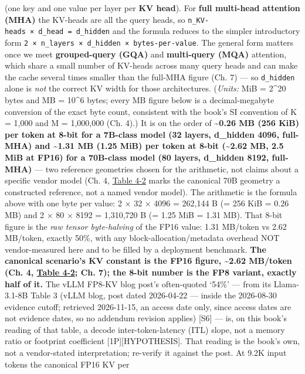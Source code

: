 (one key and one value per layer per \textbf{KV head}). For \textbf{full
multi-head attention (MHA)} the KV-heads are all the query heads, so
\texttt{n\_KV-heads\ ×\ d\_head\ =\ d\_hidden} and the formula reduces
to the simpler introductory form
\texttt{2\ ×\ n\_layers\ ×\ d\_hidden\ ×\ bytes-per-value}. The general
form matters once we meet \textbf{grouped-query (GQA)} and
\textbf{multi-query (MQA)} attention, which share a small number of
KV-heads across many query heads and can make the cache several times
smaller than the full-MHA figure (Ch. 7) --- so \texttt{d\_hidden} alone
is \emph{not} the correct KV width for those architectures.
(\emph{Units:} MiB = 2\^{}20 bytes and MB = 10\^{}6 bytes; every MB
figure below is a decimal-megabyte conversion of the exact byte count,
consistent with the book's SI convention of K = 1,000 and M = 1,000,000
(Ch. 4).) It is on the order of \textbf{\textasciitilde0.26 MB (256 KiB)
per token at 8-bit for a 7B-class model (32 layers, d\_hidden 4096,
full-MHA) and \textasciitilde1.31 MB (1.25 MiB) per token at 8-bit
(\textasciitilde2.62 MB, 2.5 MiB at FP16) for a 70B-class model (80
layers, d\_hidden 8192, full-MHA)} --- two reference geometries chosen
for the arithmetic, not claims about a specific vendor model (Ch. 4,
\hyperref[tab:4.2]{Table 4-2} marks the canonical 70B geometry a constructed reference, not
a named vendor model). The arithmetic is the formula above with one byte
per value: 2 × 32 × 4096 = 262,144 B (= 256 KiB = 0.26 MB) and 2 × 80 ×
8192 = 1,310,720 B (= 1.25 MiB = 1.31 MB). That 8-bit figure is the
\emph{raw tensor byte-halving} of the FP16 value: 1.31 MB/token vs 2.62
MB/token, exactly 50\%, with any block-allocation/metadata overhead NOT
vendor-measured here and to be filled by a deployment benchmark.
\textbf{The canonical scenario's KV constant is the FP16 figure,
\textasciitilde2.62 MB/token (Ch. 4, \hyperref[tab:4.2]{Table 4-2}; Ch. 7); the 8-bit number
is the FP8 variant, exactly half of it.} The vLLM FP8-KV blog post's
often-quoted `54\%' --- from its Llama-3.1-8B Table 3 (vLLM blog, post
dated 2026-04-22 --- inside the 2026-08-30 evidence cutoff; retrieved
2026-11-15, an access date only, since access dates are not evidence
dates, so no addendum revision applies) \mbox{{[}S6{]}} --- is, on this book's
reading of that table, a decode inter-token-latency (ITL) slope, not a
memory ratio or footprint coefficient \mbox{{[}1P{]}}\hspace{0pt}\mbox{{[}HYPOTHESIS{]}}. That
reading is the book's own, not a vendor-stated interpretation; re-verify
it against the post. At 9.2K input tokens the canonical FP16 KV per
